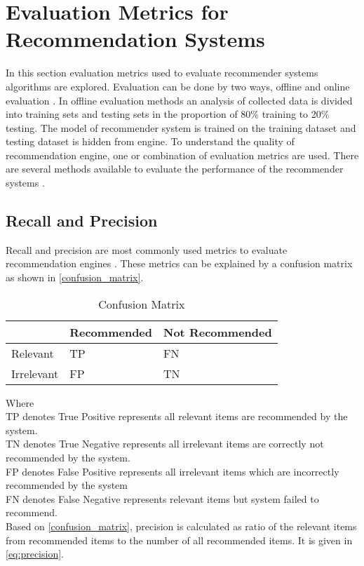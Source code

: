 
\section{Evaluation Metrics for Recommendation Systems}

In this section evaluation metrics used to evaluate recommender systems algorithms are explored. Evaluation can be done by two ways, offline and online evaluation \cite{22,23}. In offline evaluation methods an analysis of collected data is divided into training sets and testing sets in the proportion of 80\% training to 20\% testing. The model of recommender system is trained on the training dataset and testing dataset is hidden from engine. To understand the quality of recommendation engine, one or combination of evaluation metrics are used. There are several methods available to evaluate the performance of the recommender systems \cite{22,24}. 
  
\subsection{Recall and Precision}

Recall and precision are most commonly used metrics to evaluate recommendation engines \cite{25}. These metrics can be explained by a confusion matrix \cite{21} as shown in \autoref{confusion_matrix}.

\begin{table}[]
\begin{tabular}{lll}
\hline
                                 & Recommended             & Not Recommended         \\ \hline
\multicolumn{1}{|l|}{Relevant}   & \multicolumn{1}{l|}{TP} & \multicolumn{1}{l|}{FN} \\ \hline
\multicolumn{1}{|l|}{Irrelevant} & \multicolumn{1}{l|}{FP} & \multicolumn{1}{l|}{TN} \\ \hline
\end{tabular}
\caption{Confusion Matrix \cite{21}}
\label{confusion_matrix}
\end{table}

\noindent Where\\
TP denotes True Positive represents all relevant items are recommended by the system.\\
TN denotes True Negative represents all irrelevant items are correctly not recommended by the system.  \\
FP denotes False Positive represents all irrelevant items which are
incorrectly recommended by the system\\
FN denotes False Negative represents relevant items but system failed to recommend.\\
\noindent Based on \autoref{confusion_matrix}, precision is calculated as ratio of the relevant items from recommended items to the number of all recommended items. It is given in \autoref{eq:precision}. 

